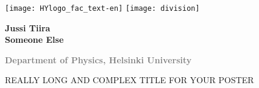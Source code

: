 \documentclass[portrait,a1]{a0poster}
\begin{document}


\begin{minipage}[t]{0.98\linewidth} %
\vspace{0pt} %


\begin{minipage}[t]{0.48\linewidth} %
\vspace{0pt} %
\texttt{[image: HYlogo\_fac\_text-en]}
\hspace{50pt}
\texttt{[image: division]}

\end{minipage} %
\begin{minipage}[t]{0.5\linewidth} %
\vspace{0pt} %

\textsf{\bfseries
Jussi Tiira \\
Someone Else
} %

\textcolor{gray}{\textsf{\bfseries{Department of Physics, Helsinki University}}}

\end{minipage}
\begin{minipage}[t]{1\linewidth}
\vspace{70pt}

\begin{spacing}{5.5}
{\Huge{}\textcolor{facultyColor}{\MakeUppercase{Really long}} \MakeUppercase{and complex title for your poster}}
\end{spacing}

\end{minipage}
\end{minipage}

\vfill %
\end{document}
